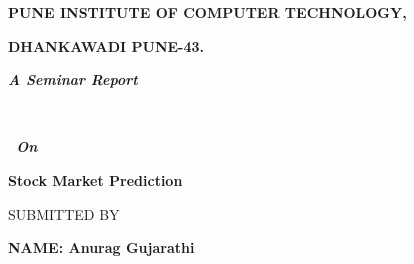 \documentclass[12pt]{article}
\begin{document}
\vspace{\baselineskip}
\begin{Center}
{\fontsize{14pt}{16.8pt}\selectfont \textbf{PUNE INSTITUTE OF COMPUTER TECHNOLOGY,}\par}
\end{Center}\par

\begin{Center}
{\fontsize{14pt}{16.8pt}\selectfont \textbf{DHANKAWADI PUNE-43.}\par}
\end{Center}\par

\begin{Center}
{\fontsize{26pt}{31.2pt}\selectfont \textbf{\textit{A Seminar Report}}\par}
\end{Center}\par

\begin{Center}
\textbf{\textit{ }\ \ \ \  }{\fontsize{24pt}{28.8pt}\selectfont \textbf{\textit{\ On  }\  }\par}
\end{Center}\par

\begin{Center}
{\fontsize{16pt}{19.2pt}\selectfont \textbf{Stock Market Prediction}\par}
\end{Center}\par

\begin{Center}
{\fontsize{14pt}{16.8pt}\selectfont  \par}
\end{Center}\par

\begin{Center}
{\fontsize{14pt}{16.8pt}\selectfont SUBMITTED BY\par}
\end{Center}\par

\begin{Center}
{\fontsize{14pt}{16.8pt}\selectfont  \par}
\end{Center}\par

\begin{Center}
{\fontsize{16pt}{19.2pt}\selectfont \textbf{NAME: Anurag Gujarathi}\par}
\end{Center}\par
\end{document}
